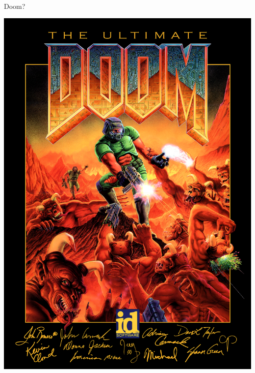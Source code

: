 \begin{frame}{Doom?}
\begin{center}
\includegraphics[keepaspectratio=true,width=0.40\paperwidth]{doom.png}
\end{center}
 


\end{frame}

